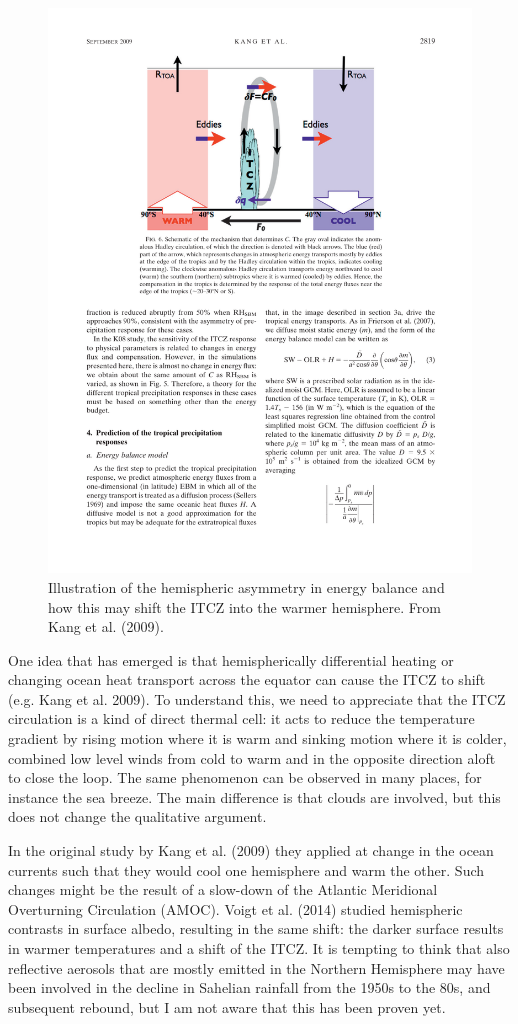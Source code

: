 \documentclass[12pt]{book}
\begin{document}
\begin{figure}
\begin{center}
\includegraphics[height=8 cm]{../external_figures/Kang_etal_2009_ITCZ}
\end{center}
\caption{ Illustration of the hemispheric asymmetry in energy balance and how this may shift the ITCZ into the warmer hemisphere. From Kang et al. (2009). } 
\label{fig:itcz_shifts}
\end{figure}

One idea that has emerged is that hemispherically differential heating or changing ocean heat transport across the equator can cause the ITCZ to shift (e.g. Kang et al. 2009). To understand this, we need to appreciate that the ITCZ circulation is a kind of direct thermal cell: it acts to reduce the temperature gradient by rising motion where it is warm and sinking motion where it is colder, combined low level winds from cold to warm and in the opposite direction aloft to close the loop. The same phenomenon can be observed in many places, for instance the sea breeze. The main difference is that clouds are involved, but this does not change the qualitative argument.

In the original study by Kang et al. (2009) they applied at change in the ocean currents such that they would cool one hemisphere and warm the other. Such changes might be the result of a slow-down of the Atlantic Meridional Overturning Circulation (AMOC). Voigt et al. (2014) studied hemispheric contrasts in surface albedo, resulting in the same shift: the darker surface results in warmer temperatures and a shift of the ITCZ. It is tempting to think that also reflective aerosols that are mostly emitted in the Northern Hemisphere may have been involved in the decline in Sahelian rainfall from the 1950s to the 80s, and subsequent rebound, but I am not aware that this has been proven yet. 
\end{document}
